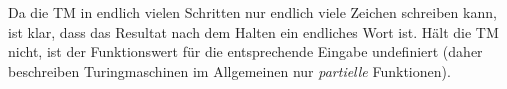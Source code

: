 Da die \ac{TM} in endlich vielen Schritten nur endlich viele Zeichen schreiben kann, ist klar, dass das Resultat nach dem Halten ein endliches Wort ist.
Hält die \ac{TM} nicht, ist der Funktionswert für die entsprechende Eingabe undefiniert (daher beschreiben Turingmaschinen im Allgemeinen nur \emph{partielle} Funktionen).




% 

